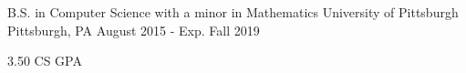 
\vspace{-7mm}


\vspace{0mm}
\begin{cventries}

  \cventry
    {B.S. in Computer Science with a minor in Mathematics} %
    {University of Pittsburgh} %
    {Pittsburgh, PA} %
    {August 2015 - Exp. Fall 2019} %
    {
      \begin{cvitems} %
        \item {3.50 CS GPA}
      \end{cvitems}
    }
    
  \vspace{-6mm}
  
\end{cventries}